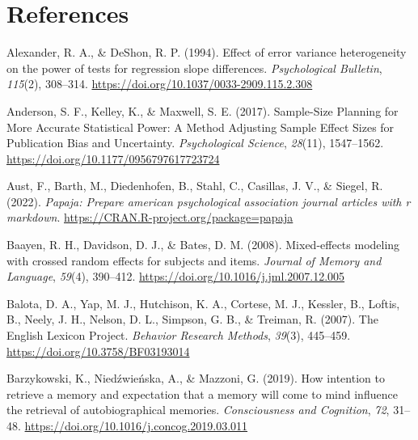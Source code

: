 \documentclass[
  man]{apa7}
\newlength{\cslhangindent}
\newlength{\cslentryspacingunit} %
\newenvironment{CSLReferences}[2] %
 {%
  \setlength{\parindent}{0pt}
  \ifodd #1
  \let\oldpar\par
  \def\par{\hangindent=\cslhangindent\oldpar}
  \fi
  \setlength{\parskip}{#2\cslentryspacingunit}
 }%
 {}
\begin{document}
\newpage

\hypertarget{references}{%
\section{References}\label{references}}

\begingroup
\setlength{\parindent}{-0.5in}
\setlength{\leftskip}{0.5in}

\hypertarget{refs}{}
\begin{CSLReferences}{1}{0}
\leavevmode{}%
Alexander, R. A., \& DeShon, R. P. (1994). Effect of error variance heterogeneity on the power of tests for regression slope differences. \emph{Psychological Bulletin}, \emph{115}(2), 308--314. \url{https://doi.org/10.1037/0033-2909.115.2.308}

\leavevmode{}%
Anderson, S. F., Kelley, K., \& Maxwell, S. E. (2017). Sample-Size Planning for More Accurate Statistical Power: A Method Adjusting Sample Effect Sizes for Publication Bias and Uncertainty. \emph{Psychological Science}, \emph{28}(11), 1547--1562. \url{https://doi.org/10.1177/0956797617723724}

\leavevmode{}%
Aust, F., Barth, M., Diedenhofen, B., Stahl, C., Casillas, J. V., \& Siegel, R. (2022). \emph{Papaja: Prepare american psychological association journal articles with r markdown}. \url{https://CRAN.R-project.org/package=papaja}

\leavevmode{}%
Baayen, R. H., Davidson, D. J., \& Bates, D. M. (2008). Mixed-effects modeling with crossed random effects for subjects and items. \emph{Journal of Memory and Language}, \emph{59}(4), 390--412. \url{https://doi.org/10.1016/j.jml.2007.12.005}

\leavevmode{}%
Balota, D. A., Yap, M. J., Hutchison, K. A., Cortese, M. J., Kessler, B., Loftis, B., Neely, J. H., Nelson, D. L., Simpson, G. B., \& Treiman, R. (2007). The English Lexicon Project. \emph{Behavior Research Methods}, \emph{39}(3), 445--459. \url{https://doi.org/10.3758/BF03193014}

\leavevmode{}%
Barzykowski, K., Niedźwieńska, A., \& Mazzoni, G. (2019). How intention to retrieve a memory and expectation that a memory will come to mind influence the retrieval of autobiographical memories. \emph{Consciousness and Cognition}, \emph{72}, 31--48. \url{https://doi.org/10.1016/j.concog.2019.03.011}


\end{CSLReferences}
\end{document}
